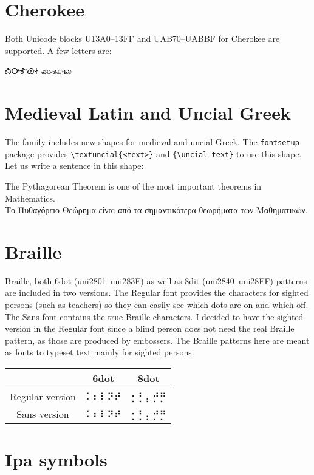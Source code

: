 \documentclass{article}
\begin{document}
\section{Cherokee}
Both Unicode blocks 
U13A0--13FF and UAB70--UABBF for Cherokee are supported. A few letters are:
\begin{center}
  ᎣᎤᎹᏊᏐ  ꭳꭴꭷꮂꮔꮿ
\end{center}


\section{Medieval Latin and Uncial Greek}
The family includes new shapes for medieval and uncial Greek.
The \verb|fontsetup| package provides \verb|\textuncial{<text>}| and
\verb|{\uncial text}| to use this shape. Let us write a sentence
in this shape:
\begin{center}
  \begin{minipage}{9cm}
{\uncial    The Pythagorean Theorem is one of the most important theorems in Mathematics.}\\
{\uncial    Το Πυθαγόρειο Θεώρημα είναι από τα σημαντικότερα θε\-ω\-ρή\-μα\-τα των Mαθηματικών.}
  \end{minipage}
\end{center}
\section{Braille}
Braille, both 6dot (uni2801--uni283F)
as well as 8dit (uni2840--uni28FF) patterns
are included in two versions. The Regular font provides the
characters for sighted persons (such as teachers) so they can easily see which dots are
on and which off. The Sans font contains the true Braille characters. I decided to have the
sighted version in the Regular font since a blind person does not need the real Braille pattern,
as those are produced by embossers. The Braille patterns here are meant as fonts to
typeset text mainly for sighted persons.
\begin{center}
  \begin{tabular}{c|c|c}
    & 6dot & 8dot\\ \hline
    Regular version & ⠅⠆⠇⠝⠞ & ⡂⡃⡄⡚⡛\\ \hline
    Sans version &{\sffamily ⠅⠆⠇⠝⠞} &{\sffamily ⡂⡃⡄⡚⡛}
  \end{tabular}
\end{center}

\section{Ipa symbols}
\end{document}
